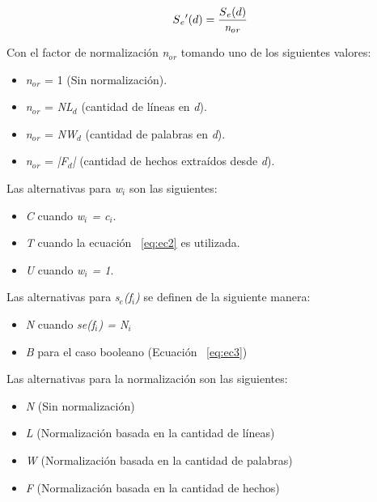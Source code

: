 \begin{equation}
\label{eq:ec4}
S{_e}'(d) = \frac {S{_e}(d)} {\emph{n${_o}$${_r}$}}
\end{equation}

Con el factor de normalizaci\'on \emph{n${_o}$${_r}$} tomando uno de los siguientes valores:
\begin{itemize}
\item \emph{n${_o}$${_r}$} = 1 (Sin normalizaci\'on).
\item \emph{n${_o}$${_r}$} = \emph{NL${_d}$} (cantidad de l\'ineas en \emph{d}).
\item \emph{n${_o}$${_r}$} = \emph{NW${_d}$} (cantidad de palabras en \emph{d}).
\item \emph{n${_o}$${_r}$} = \emph{|F${_d}$|} (cantidad de hechos extra\'idos desde \emph{d}).\\
\end{itemize}

Las alternativas para \emph{w${_i}$} son las siguientes:
\begin{itemize}
\item	\emph{C} cuando \emph{w${_i}$ = c${_i}$}.
\item	\emph{T} cuando la ecuaci\'on ~\ref{eq:ec2} es utilizada.
\item	\emph{U} cuando \emph{w${_i}$ = 1}. \\
\end{itemize}

Las alternativas para \emph{s${_e}$(f${_i}$)} se definen de la siguiente manera:
\begin{itemize}
\item	\emph{N} cuando \emph{se(f${_i}$) = N${_i}$}
\item	\emph{B} para el caso booleano (Ecuaci\'on ~\ref{eq:ec3}) \\
\end{itemize}

Las alternativas para la normalizaci\'on son las siguientes:
\begin{itemize}
\item	\emph{N} (Sin normalizaci\'on)
\item   \emph{L} (Normalizaci\'on basada en la cantidad de l\'ineas)
\item	\emph{W} (Normalizaci\'on basada en la cantidad de palabras)
\item	\emph{F} (Normalizaci\'on basada en la cantidad de hechos) \\
\end{itemize}

